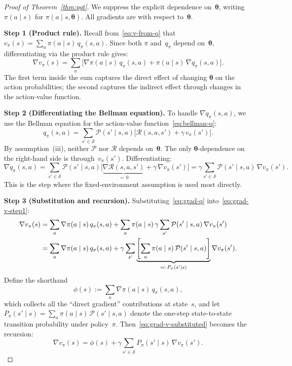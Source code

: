 \begin{proof}[Proof of Theorem~\ref{thm:pgt}]
We suppress the explicit dependence on~$\bm{\theta}$, writing $\pi(a\mid s)$ for $\pi(a\mid s,\bm{\theta})$. All gradients are with respect to~$\bm{\theta}$.

\medskip\noindent\textbf{Step 1 (Product rule).}\quad
Recall from~\eqref{eq:v-from-q} that $v_\pi(s) = \sum_a \pi(a\mid s)\,q_\pi(s,a)$. Since both $\pi$ and~$q_\pi$ depend on~$\bm{\theta}$, differentiating via the product rule gives:
\begin{equation}\label{eq:grad-v-step1}
  \nabla v_\pi(s) = \sum_a \bigl[\nabla\pi(a\mid s)\,q_\pi(s,a) + \pi(a\mid s)\,\nabla q_\pi(s,a)\bigr].
\end{equation}
The first term inside the sum captures the direct effect of changing $\bm{\theta}$ on the action probabilities; the second captures the indirect effect through changes in the action-value function.

\medskip\noindent\textbf{Step 2 (Differentiating the Bellman equation).}\quad
To handle $\nabla q_\pi(s,a)$, we use the Bellman equation for the action-value function~\eqref{eq:bellman-q}:
\[
  q_\pi(s,a) = \sum_{s'\in\mathcal{S}} \mathcal{P}(s'\mid s,a)\bigl[\mathcal{R}(s,a,s') + \gamma\, v_\pi(s')\bigr].
\]
By assumption~(iii), neither $\mathcal{P}$ nor $\mathcal{R}$ depends on~$\bm{\theta}$. The only $\bm{\theta}$-dependence on the right-hand side is through~$v_\pi(s')$. Differentiating:
\begin{equation}\label{eq:grad-q}
  \nabla q_\pi(s,a)
  = \sum_{s'\in\mathcal{S}} \mathcal{P}(s'\mid s,a)\bigl[\underbrace{\nabla\mathcal{R}(s,a,s')}_{=\,0} + \gamma\,\nabla v_\pi(s')\bigr]
  = \gamma\sum_{s'\in\mathcal{S}}\mathcal{P}(s'\mid s,a)\,\nabla v_\pi(s').
\end{equation}
This is the step where the fixed-environment assumption is used most directly.

\medskip\noindent\textbf{Step 3 (Substitution and recursion).}\quad
Substituting~\eqref{eq:grad-q} into~\eqref{eq:grad-v-step1}:
\begin{align}
  \nabla v_\pi(s)
  &= \sum_a \nabla\pi(a\mid s)\,q_\pi(s,a) + \sum_a \pi(a\mid s)\,\gamma\sum_{s'}\mathcal{P}(s'\mid s,a)\,\nabla v_\pi(s') \notag \\
  &= \sum_a \nabla\pi(a\mid s)\,q_\pi(s,a) + \gamma\sum_{s'}\underbrace{\left[\sum_a \pi(a\mid s)\,\mathcal{P}(s'\mid s,a)\right]}_{=:\,P_\pi(s'\mid s)}\nabla v_\pi(s'). \label{eq:grad-v-substituted}
\end{align}
Define the shorthand
\[
  \phi(s) := \sum_a \nabla\pi(a\mid s)\,q_\pi(s,a),
\]
which collects all the ``direct gradient'' contributions at state~$s$, and let $P_\pi(s'\mid s) = \sum_a \pi(a\mid s)\,\mathcal{P}(s'\mid s,a)$ denote the one-step state-to-state transition probability under policy~$\pi$. Then~\eqref{eq:grad-v-substituted} becomes the recursion:
\begin{equation}\label{eq:grad-v-recursive}
  \nabla v_\pi(s) = \phi(s) + \gamma\sum_{s'\in\mathcal{S}} P_\pi(s'\mid s)\,\nabla v_\pi(s').
\end{equation}


\end{proof}
